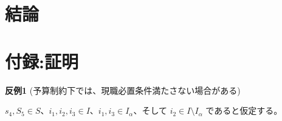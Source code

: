 \documentclass[12pt, a4paper]{article}
\newcommand{\source}[1]{\par\noindent{\footnotesize #1}} %
\theoremstyle{definition}
\theoremstyle{remark}
\theoremstyle{plain}
\begin{document}

\section{結論}


\section*{付録:証明}

  

\textbf{反例1} (予算制約下では、現職必置条件満たさない場合がある)

$s_4, S_5 \in S$、$i_1, i_2, i_3 \in I$、$i_1, i_3 \in I_\alpha$、そして $i_2 \in I \setminus I_\alpha$ であると仮定する。
\end{document}
